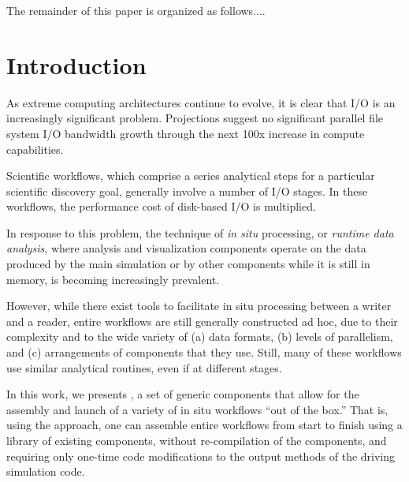The remainder of this paper is organized as follows....


\section{Introduction}
\label{s:intro}

As extreme computing architectures continue to evolve, it is 
clear that I/O is an increasingly significant problem.  Projections suggest no
significant parallel file system I/O bandwidth growth through the next 100x
increase in compute capabilities.

Scientific workflows, which comprise a series analytical steps for a
particular scientific discovery goal, generally involve a number of
I/O stages. In these workflows, the performance cost of disk-based I/O
is multiplied.

In response to this problem, the technique of \textit{in situ}
processing, or \textit{runtime data analysis},
where analysis and visualization components
operate on the data produced by the main simulation
or by other components while it is still in memory,
is becoming increasingly prevalent.


However, while there exist tools to facilitate in situ
processing between a writer and a reader, 
entire workflows are still generally constructed ad hoc,
due to their complexity and to the wide variety of (a) data formats,
(b) levels of parallelism, and (c) arrangements of components that
they use. Still, many of these workflows use similar analytical
routines, even if at different stages.

In this work, we presents \sys, a set of
generic components that allow for the assembly
and launch of a variety of in situ workflows
``out of the box.''
That is, using the \sys approach, one can assemble
entire workflows from start to finish using a library
of existing components, without re-compilation of the
components, and requiring only one-time code modifications
to the output methods of the driving simulation code.

